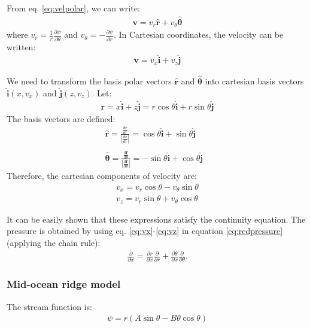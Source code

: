 \documentclass[a4paper,11pt]{article}
\begin{document}
From eq. \ref{eq:velpolar}, we can write:
\begin{align}
\textbf{v} = v_r\hat{\textbf{r}}+v_\theta\hat{\bm{\theta}}
\end{align}
where $v_r= \frac{1}{r}\frac{\partial\psi}{\partial\theta}$ and $v_\theta=-\frac{\partial\psi}{\partial r}$. In Cartesian coordinates, the velocity can be written:
\begin{align}
\textbf{v} = v_x\hat{\textbf{i}}+v_z\hat{\textbf{j}}
\end{align}

We need to transform the basis polar vectors $\hat{\textbf{r}}$ and $\hat{\bm{\theta}}$ into cartesian basis vectors $\hat{\textbf{i}}(x,v_x)$ and $\hat{\textbf{j}}(z,v_z)$. Let:
\begin{align}
\textbf{r} = x\hat{\textbf{i}}+z\hat{\textbf{j}} = r\cos\theta\hat{\textbf{i}} + r\sin\theta\hat{\textbf{j}}
\end{align}
The basis vectors are defined: 
\begin{align}
\hat{\textbf{r}} = \frac{\frac{d\textbf{r}}{dr}}{\left|\frac{d\textbf{r}}{dr}\right|} = \cos\theta\hat{\textbf{i}} + \sin\theta\hat{\textbf{j}}\\
&\nonumber  \\
\hat{\bm{\theta}} = \frac{\frac{d\textbf{r}}{d\theta}}{\left|\frac{d\textbf{r}}{d\theta}\right|} = -\sin\theta\hat{\textbf{i}} + \cos\theta\hat{\textbf{j}}
\end{align}
Therefore, the cartesian components of velocity are:
\begin{align}
v_x = v_r\cos\theta - v_\theta\sin\theta \label{eq:vx}\\
v_z = v_r\sin\theta + v_\theta\cos\theta \label{eq:vz}
\end{align}

It can be easily shown that these expressions satisfy the continuity equation. The pressure is obtained by using eq. \ref{eq:vx}-\ref{eq:vz} in equation \ref{eq:redpressure} (applying the chain rule):
\begin{align}
 \frac{\partial}{\partial x}=\frac{\partial r}{\partial x}\frac{\partial}{\partial r}+\frac{\partial \theta}{\partial x}\frac{\partial}{\partial \theta}.
 \end{align}

\subsubsection{Mid-ocean ridge model}
The stream function is:
\begin{align}
\psi = r(A\sin\theta-B\theta\cos\theta)
\end{align}
\end{document}
